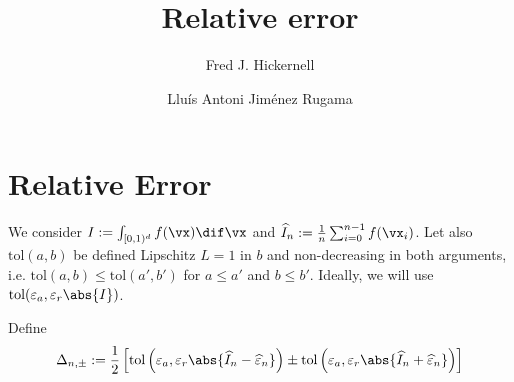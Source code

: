 \documentclass[]{elsarticle}
\theoremstyle{definition}
\newcommand{\cube}{[0,1)^d}
\newcommand{\tol}{\text{tol}}
\begin{document}
\begin{frontmatter}

\title{Relative error}
\author{Fred J. Hickernell}
\address{Room E1-208, Department of Applied Mathematics, Illinois Institute of Technology,\\ 10 W.\ 32$^{\text{nd}}$ St., Chicago, IL 60616}
\author{Llu\'{i}s Antoni Jim\'{e}nez Rugama}
\address{Room E1-120, Department of Applied Mathematics, Illinois Institute of Technology,\\ 10 W.\ 32$^{\text{nd}}$ St., Chicago, IL 60616}
\begin{abstract}
\end{abstract}

\end{frontmatter}

\section{Relative Error}
We consider $I:=\int_{\cube}f(\vx)\dif \vx$ and $\widehat{I}_n:=\frac 1 n \sum_{i=0}^{n-1}f(\vx_i)$. Let also $\tol(a,b)$ be defined Lipschitz $L=1$ in $b$ and non-decreasing in both arguments, i.e. $\tol(a,b)\leq \tol(a',b')$ for $a\leq a'$ and $b\leq b'$. Ideally, we will use $\tol(\varepsilon_a,\varepsilon_r\abs{I})$.

Define
\[
\Delta_{n,\pm}:=\frac 1 2 \left[ \tol\left(\varepsilon_a,\varepsilon_r\abs{\widehat{I}_n-\widehat{\varepsilon}_n}\right) \pm \tol\left(\varepsilon_a,\varepsilon_r\abs{\widehat{I}_n+\widehat{\varepsilon}_n}\right) \right]
\]
\end{document}

